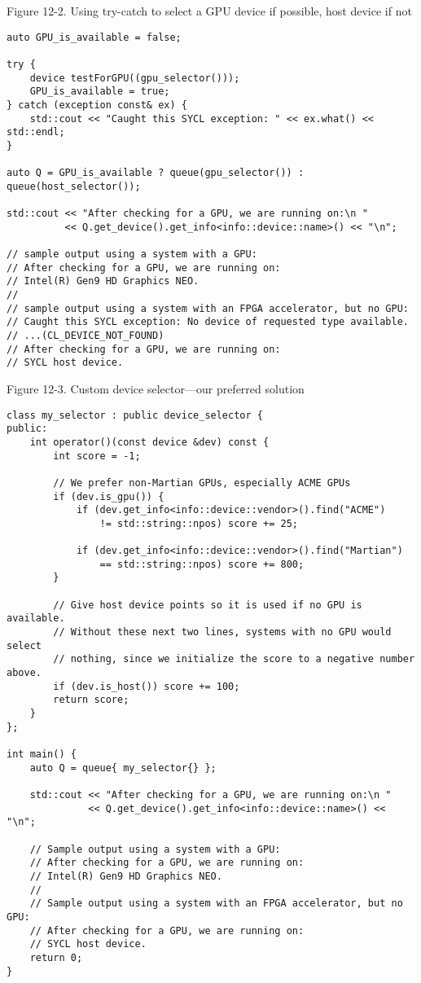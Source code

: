\hspace*{\fill} \par %
Figure 12-2. Using try-catch to select a GPU device if possible, host device if not
\begin{lstlisting}[caption={}]
auto GPU_is_available = false;

try {
	device testForGPU((gpu_selector()));
	GPU_is_available = true;
} catch (exception const& ex) {
	std::cout << "Caught this SYCL exception: " << ex.what() << std::endl;
}

auto Q = GPU_is_available ? queue(gpu_selector()) : queue(host_selector());

std::cout << "After checking for a GPU, we are running on:\n "
	  	  << Q.get_device().get_info<info::device::name>() << "\n";

// sample output using a system with a GPU:
// After checking for a GPU, we are running on:
// Intel(R) Gen9 HD Graphics NEO.
// 
// sample output using a system with an FPGA accelerator, but no GPU:
// Caught this SYCL exception: No device of requested type available.
// ...(CL_DEVICE_NOT_FOUND)
// After checking for a GPU, we are running on:
// SYCL host device.
\end{lstlisting}

\hspace*{\fill} \par %
Figure 12-3. Custom device selector—our preferred solution
\begin{lstlisting}[caption={}]
class my_selector : public device_selector {
public:
	int operator()(const device &dev) const {
		int score = -1;
		
		// We prefer non-Martian GPUs, especially ACME GPUs
		if (dev.is_gpu()) {
			if (dev.get_info<info::device::vendor>().find("ACME")
				!= std::string::npos) score += 25;
			
			if (dev.get_info<info::device::vendor>().find("Martian")
				== std::string::npos) score += 800;
		}
	
		// Give host device points so it is used if no GPU is available.
		// Without these next two lines, systems with no GPU would select
		// nothing, since we initialize the score to a negative number above.
		if (dev.is_host()) score += 100;
		return score;
	}
};

int main() {
	auto Q = queue{ my_selector{} };
	
	std::cout << "After checking for a GPU, we are running on:\n "
			  << Q.get_device().get_info<info::device::name>() << "\n";
			  
	// Sample output using a system with a GPU:
	// After checking for a GPU, we are running on:
	// Intel(R) Gen9 HD Graphics NEO.
	// 
	// Sample output using a system with an FPGA accelerator, but no GPU:
	// After checking for a GPU, we are running on:
	// SYCL host device.
	return 0;
}
\end{lstlisting}

